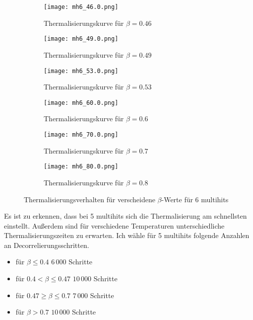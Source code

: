 \documentclass[12pt]{article}
\begin{document}
\vspace*{-4cm}\begin{figure}[H]\hspace*{-1.5cm}
\begin{subfigure}{0.4\textwidth}
                \texttt{[image: mh6\_46.0.png]}
                \caption{Thermalisierungskurve für $\beta=0.46$}
                \end{subfigure}
                \hfill
                \begin{subfigure}{0.4\textwidth}
                \hspace*{-0.8cm}
                \texttt{[image: mh6\_49.0.png]}
                \caption{Thermalisierungskurve für $\beta=0.49$}
                \end{subfigure}
                \hfill
                \hspace*{-1.5cm}
                \begin{subfigure}{0.4\textwidth}
                \texttt{[image: mh6\_53.0.png]}
                \caption{Thermalisierungskurve für $\beta=0.53$}
                \end{subfigure}
                \hfill
                \begin{subfigure}{0.4\textwidth}
                \hspace*{-0.8cm}
                \texttt{[image: mh6\_60.0.png]}
                \caption{Thermalisierungskurve für $\beta=0.6$}
                \end{subfigure}
                \hfill
                \hspace*{-1.5cm}
                \begin{subfigure}{0.4\textwidth}
                \texttt{[image: mh6\_70.0.png]}
                \caption{Thermalisierungskurve für $\beta=0.7$}
                \end{subfigure}
                \hfill
                \begin{subfigure}{0.4\textwidth}
                \hspace*{-0.8cm}
                \texttt{[image: mh6\_80.0.png]}
                \caption{Thermalisierungskurve für $\beta=0.8$}
                \end{subfigure}
                \hfill
                \caption{Thermalisierungsverhalten für verscheidene $\beta$-Werte für 6 multihits}
\end{figure}
Es ist zu erkennen, dass bei 5 multihits sich die Thermalisierung am schnellsten einstellt. Außerdem sind für verschiedene Temperaturen unterschiedliche Thermalisierungszeiten zu erwarten. Ich wähle für 5 multihits folgende Anzahlen an Decorrelierungsschritten. 
\begin{itemize}
    \item für $\beta\leq0.4$ $6\,000$ Schritte
    \item für $0.4<\beta\leq 0.47$ $10\,000$ Schritte
    \item für $0.47\geq\beta\leq0.7$ $7\,000$ Schritte
    \item für $\beta>0.7$ $10\,000$ Schritte
\end{itemize}
\end{document}
